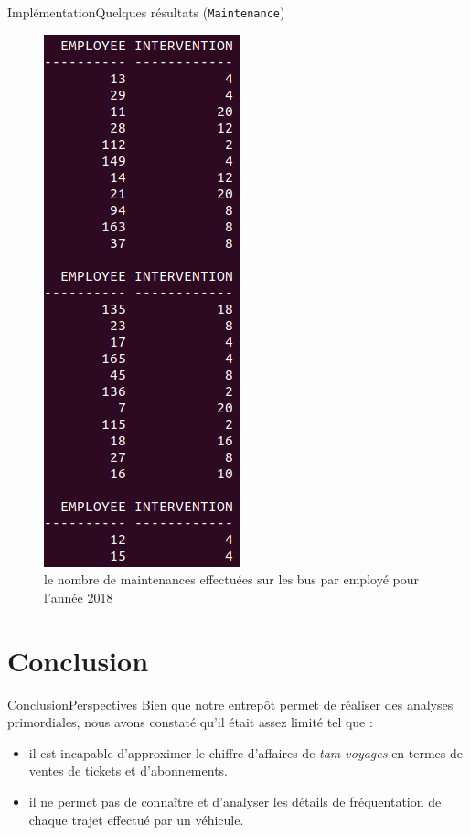 \documentclass[a4paper,12pt,usenames,dvipsnames]{beamer}
\begin{document}
\begin{frame}{Implémentation}{Quelques résultats (\texttt{Maintenance})}
\begin{figure}[!ht]
  \centering
  \includegraphics[scale=0.25]{images/requetes_analytiques/requ7.png}
  \caption{le nombre de maintenances effectuées sur les bus par employé pour l'année 2018}
\end{figure}
\end{frame}

\section{Conclusion}
\begin{frame}{Conclusion}{Perspectives}
  Bien que notre entrepôt permet de réaliser des analyses primordiales, nous avons constaté qu’il était assez limité tel que :
  \begin{itemize}
    \item il est incapable d'approximer le chiffre d’affaires de \textit{tam-voyages} en termes de ventes de tickets et d'abonnements.
    \item il ne permet pas de connaître et d'analyser les détails de fréquentation de chaque trajet effectué par un véhicule.
  \end{itemize}
\end{frame}
\end{document}
